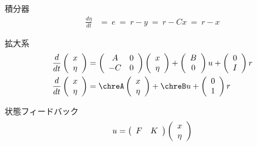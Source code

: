 積分器
\begin{align*}
	\frac{d \eta}{dt}&= \ e \ = \ r-y \ = \ r- C x \ = \ r-x
\end{align*}

拡大系
\begin{align*}
	\frac{d}{dt}
	\state	
	& = 
	\left (
	\begin{array}{cc}
	 A & 0 \\
	 -C& 0
	\end{array}
	\right )
	\state
	+
	\left (
	\begin{array}{c}
	 B \\ 0 
	\end{array}
	\right )
	u
	+
	\left (
	\begin{array}{c}
	 0 \\ I 
	\end{array}
	\right )
	r
\\
	\frac{d}{dt}
	\state
	& = 
	\chreA	\state
	+
	\chreB	u
	+
	\left (
	\begin{array}{c}
	 0 \\ 1 
	\end{array}
	\right )
	r
\end{align*}

状態フィードバック
\begin{align*}
	u = \left ( \begin{array}{cc}
			F & K \end{array} \right )
		\left ( \begin{array}{c} x \\ \eta \end{array} \right )
\end{align*}

